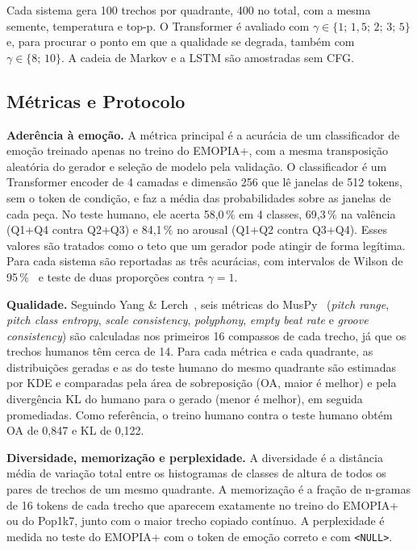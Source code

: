 \documentclass{article}
\begin{document}
Cada sistema gera 100 trechos por quadrante, 400 no total, com a mesma semente,
temperatura e top-p. O Transformer é avaliado com
$\gamma \in \{1;\,1{,}5;\,2;\,3;\,5\}$ e, para procurar o ponto em que a
qualidade se degrada, também com $\gamma \in \{8;\,10\}$. A cadeia de Markov e
a LSTM são amostradas sem CFG.

\subsection{Métricas e Protocolo}

\textbf{Aderência à emoção.} A métrica principal é a acurácia de um
classificador de emoção treinado apenas no treino do EMOPIA+, com a mesma
transposição aleatória do gerador e seleção de modelo pela validação. O
classificador é um Transformer encoder de 4 camadas e dimensão 256 que lê
janelas de 512 tokens, sem o token de condição, e faz a média das
probabilidades sobre as janelas de cada peça. No teste humano, ele acerta
58,0\,\% em 4 classes, 69,3\,\% na valência (Q1+Q4 contra Q2+Q3) e 84,1\,\% no
arousal (Q1+Q2 contra Q3+Q4). Esses valores são tratados como o teto que um
gerador pode atingir de forma legítima. Para cada sistema são reportadas as três
acurácias, com intervalos de Wilson de 95\,\%~\cite{Wilson1927:ci} e teste de
duas proporções contra $\gamma = 1$.

\textbf{Qualidade.} Seguindo Yang \& Lerch~\cite{Yang2020:eval}, seis métricas
do MusPy~\cite{Dong2020:muspy} (\emph{pitch range}, \emph{pitch class entropy},
\emph{scale consistency}, \emph{polyphony}, \emph{empty beat rate} e
\emph{groove consistency}) são calculadas nos primeiros 16 compassos de cada
trecho, já que os trechos humanos têm cerca de 14. Para cada métrica e cada
quadrante, as distribuições geradas e as do teste humano do mesmo quadrante são
estimadas por KDE e comparadas pela área de sobreposição (OA, maior é melhor) e
pela divergência KL do humano para o gerado (menor é melhor), em seguida
promediadas. Como referência, o treino humano contra o teste humano obtém
OA de 0,847 e KL de 0,122.

\textbf{Diversidade, memorização e perplexidade.} A diversidade é a distância
média de variação total entre os histogramas de classes de altura de todos os
pares de trechos de um mesmo quadrante. A memorização é a fração de n-gramas de
16 tokens de cada trecho que aparecem exatamente no treino do EMOPIA+ ou do
Pop1k7, junto com o maior trecho copiado contínuo. A perplexidade é medida no
teste do EMOPIA+ com o token de emoção correto e com \texttt{<NULL>}.
\end{document}
